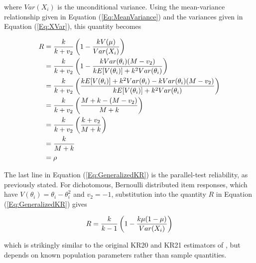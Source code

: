 \documentclass[12pt,epsfig]{article}
\newcommand{\changed}[1]{\textcolor{black}{#1}}
\newcommand{\testlength}{\changed{k}}%
\begin{document}
\noindent where $Var(X_i)$ is the unconditional variance.  Using the mean-variance relationship given in Equation (\ref{Eq:MeanVariance}) and the variances given in Equation (\ref{Eq:XVar}), this quantity becomes

\begin{equation}
\begin{aligned}
R  & =  \dfrac{\testlength}{\testlength + v_2} \left(1 - \dfrac{\testlength V(\mu)}{Var(X_i)}\right)\\
 & = \dfrac{\testlength}{\testlength + v_2} \left(1 - \dfrac{\testlength Var(\theta_i) (M - v_2) }{\testlength E[V(\theta_i)] + \testlength^2 Var(\theta_i)}\right)\\
 & = \dfrac{\testlength}{\testlength + v_2} \left(\dfrac{\changed{\testlength E[V(\theta_i)] + \testlength^2 Var(\theta_i)} - \testlength Var(\theta_i) (M - v_2) }{\testlength E[V(\theta_i)] + \testlength^2 Var(\theta_i)}\right)\\
 & = \dfrac{\testlength}{\testlength + v_2} \left(\dfrac{M + \testlength - (M - v_2) }{M + \testlength}\right)\\
 & = \dfrac{\testlength}{\testlength + v_2} \left(\dfrac{\testlength + v_2}{M + \testlength}\right)\\
 & = \dfrac{\testlength}{M + \testlength} \\
 & = \rho
\end{aligned}
\label{Eq:TheBigResult}
\end{equation}

\noindent The last line in Equation (\ref{Eq:GeneralizedKR}) is the parallel-test reliability, as previously stated. For dichotomous, Bernoulli distributed item responses, which have $V(\theta_i) = \theta_i - \theta_i^2$ and $v_2 = -1$, substitution into the quantity $R$ in Equation (\ref{Eq:GeneralizedKR}) gives

\begin{equation*}
R = \dfrac{\testlength}{\testlength -1} \left(1 - \dfrac{\testlength \mu (1-\mu)}{Var(X_i)}\right)
\end{equation*} 

\noindent which is strikingly similar to the original KR20 and KR21 estimators of \cite{Kuder1937}, but depends on known population parameters rather than sample quantities.

\end{document}
